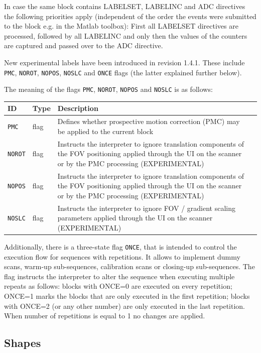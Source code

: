 \documentclass{article}
\begin{document}
In case the same block contains LABELSET, LABELINC and ADC directives the following priorities apply (independent of the order the events were submitted to the block e.g. in the Matlab toolbox): First all LABELSET directives are processed, followed by all LABELINC and only then the values of the counters are captured and passed over to the ADC directive.  

New experimental labels have been introduced in revision 1.4.1. These include \verb.PMC., \verb.NOROT., \verb.NOPOS., \verb.NOSLC. and \verb.ONCE. flags (the latter explained further below). 

The meaning of the flags \verb.PMC., \verb.NOROT., \verb.NOPOS. and \verb.NOSLC. is as follows:

\begin{tabularx}{\textwidth}{llXl}
\toprule
ID & Type & Description\\
\midrule
\verb.PMC. & flag & Defines whether prospective motion correction (PMC) may be applied to the current block \\
\verb.NOROT. & flag & Instructs the interpreter to ignore translation components of the FOV positioning applied through the UI on the scanner or by the PMC processing (EXPERIMENTAL) \\
\verb.NOPOS. & flag & Instructs the interpreter to ignore translation components of the FOV positioning applied through the UI on the scanner or by the PMC processing (EXPERIMENTAL) \\
\verb.NOSLC. & flag & Instructs the interpreter to ignore FOV / gradient scaling parameters applied through the UI on the scanner (EXPERIMENTAL) \\
\bottomrule
\end{tabularx}

Additionally, there is a three-state flag \verb.ONCE., that is intended to control the execution flow for sequences with repetitions. It allows to implement dummy scans, warm-up sub-sequences, calibration scans or closing-up sub-sequences. The flag instructs the interpreter to alter the sequence when executing multiple repeats as follows: blocks with ONCE=0 are executed on every repetition; ONCE=1 marks the blocks that are only executed in the first repetition; blocks with ONCE=2 (or any other number) are only executed in the last repetition. When number of repetitions is equal to 1 no changes are applied.

\subsection{Shapes}
\end{document}
